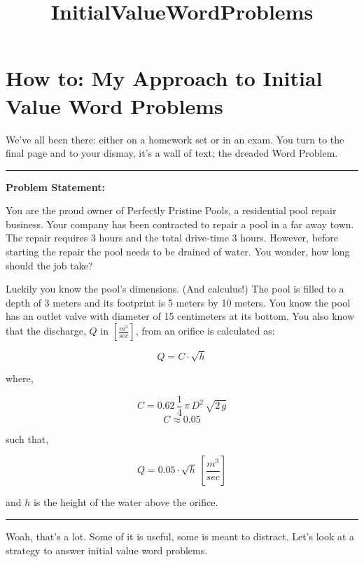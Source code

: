 \documentclass[11pt]{article}
\title{InitialValueWordProblems}
\begin{document}
    
    
    \maketitle
    
    

    
    \hypertarget{how-to-my-approach-to-initial-value-word-problems}{%
\section{How to: My Approach to Initial Value Word
Problems}\label{how-to-my-approach-to-initial-value-word-problems}}

We've all been there: either on a homework set or in an exam. You turn
to the final page and to your dismay, it's a wall of text; the dreaded
Word Problem.

    \begin{center}\rule{0.5\linewidth}{\linethickness}\end{center}

\textbf{Problem Statement:}

You are the proud owner of Perfectly Pristine Pools, a residential pool
repair business. Your company has been contracted to repair a pool in a
far away town. The repair requires 3 hours and the total drive-time 3
hours. However, before starting the repair the pool needs to be drained
of water. You wonder, how long should the job take?

Luckily you know the pool's dimensions. (And calculus!) The pool is
filled to a depth of 3 meters and its footprint is 5 meters by 10
meters. You know the pool has an outlet valve with diameter of 15
centimeters at its bottom. You also know that the discharge, \(Q\) in
\(\left[\frac{m^3}{sec}\right]\), from an orifice is calculated as:

\[Q = C \cdot \sqrt{h}\]

where,

\[C = 0.62 \, \frac{1}{4} \, \pi \, D^2 \, \sqrt{2 \, g}\]
\[C \approx 0.05 \]

such that,

\[Q = 0.05 \cdot \sqrt{h} \, \left[\frac{m^3}{sec}\right]\]

and \(h\) is the height of the water above the orifice.

\begin{center}\rule{0.5\linewidth}{\linethickness}\end{center}

    Woah, that's a lot. Some of it is useful, some is meant to distract.
Let's look at a strategy to answer initial value word problems.
\end{document}
